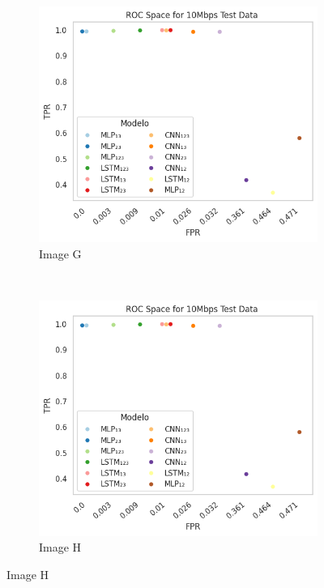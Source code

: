 \documentclass[a4paper,fleqn]{cas-sc}
\begin{document}
\begin{figure}
\begin{minipage}[t]{0.46\textwidth}
			\begin{subfigure}[t]{0.33\textwidth}
				\includegraphics[draft=false, width=\textwidth]{./figs/ROC-Space-Test-Data-10Mbps.png} 
				\caption{Image G}
				\label{fig:1a}
			\end{subfigure}%
			~
			\begin{subfigure}[t]{0.33\textwidth}
				\includegraphics[draft=false, width=\textwidth]{./figs/ROC-Space-Test-Data-10Mbps.png} 
				\caption{Image H}
				\label{fig:2a}
			\end{subfigure}%

\end{minipage}
\end{figure}
\end{document}
